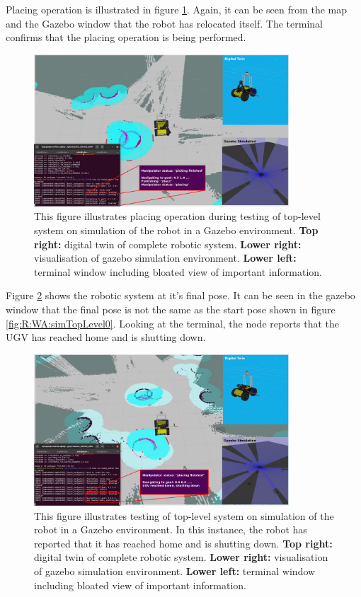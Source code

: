 Placing operation is illustrated in figure \ref{fig:R:WA:simTopLevel2}. Again, it can be seen from the map and the Gazebo window that the robot has relocated itself. The terminal confirms that the placing operation is being performed.

\begin{figure}[H]
  \centering
  \includegraphics[width = 0.85\textwidth]{Figures/figSimTopLevel2.pdf}
  \caption{This figure illustrates placing operation during testing of top-level system on simulation of the robot in a Gazebo environment. \textbf{Top right:} digital twin of complete robotic system. \textbf{Lower right:} visualisation of gazebo simulation environment. \textbf{Lower left:} terminal window including bloated view of important information.}
  \label{fig:R:WA:simTopLevel2}
\end{figure}

Figure \ref{fig:R:WA:simTopLevel3} shows the robotic system at it's final pose. It can be seen in the gazebo window that the final pose is not the same as the start pose shown in figure \ref{fig:R:WA:simTopLevel0}. Looking at the terminal, the node reports that the UGV has reached home and is shutting down.

\begin{figure}[H]
  \centering
  \includegraphics[width = 0.85\textwidth]{Figures/figSimTopLevel3.pdf}
  \caption{This figure illustrates testing of top-level system on simulation of the robot in a Gazebo environment. In this instance, the robot has reported that it has reached home and is shutting down. \textbf{Top right:} digital twin of complete robotic system. \textbf{Lower right:} visualisation of gazebo simulation environment. \textbf{Lower left:} terminal window including bloated view of important information.}
  \label{fig:R:WA:simTopLevel3}
\end{figure}

